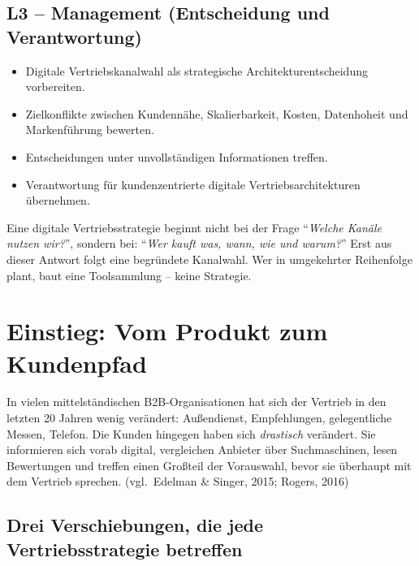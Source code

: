 \documentclass[11pt,a4paper,oneside]{article}
\newcommand{\quelle}[1]{{\footnotesize\color{lpGray}(#1)}}
\begin{document}
\subsection*{L3 -- Management (Entscheidung und Verantwortung)}
\begin{itemize}
  \item Digitale Vertriebskanalwahl als strategische Architekturentscheidung vorbereiten.
  \item Zielkonflikte zwischen Kundennähe, Skalierbarkeit, Kosten, Datenhoheit und Markenführung bewerten.
  \item Entscheidungen unter unvollständigen Informationen treffen.
  \item Verantwortung für kundenzentrierte digitale Vertriebsarchitekturen übernehmen.
\end{itemize}

\begin{merkbox}
Eine digitale Vertriebsstrategie beginnt nicht bei der Frage ``\emph{Welche Kanäle nutzen wir?}'', sondern bei: ``\emph{Wer kauft was, wann, wie und warum?}'' Erst aus dieser Antwort folgt eine begründete Kanalwahl. Wer in umgekehrter Reihenfolge plant, baut eine Toolsammlung -- keine Strategie.
\end{merkbox}

\clearpage

\section{Einstieg: Vom Produkt zum Kundenpfad}

In vielen mittelständischen B2B-Organisationen hat sich der Vertrieb in den letzten 20 Jahren wenig verändert: Außendienst, Empfehlungen, gelegentliche Messen, Telefon. Die Kunden hingegen haben sich \emph{drastisch} verändert. Sie informieren sich vorab digital, vergleichen Anbieter über Suchmaschinen, lesen Bewertungen und treffen einen Großteil der Vorauswahl, bevor sie überhaupt mit dem Vertrieb sprechen. \quelle{vgl.\ Edelman \& Singer, 2015; Rogers, 2016}

\subsection{Drei Verschiebungen, die jede Vertriebsstrategie betreffen}
\end{document}

